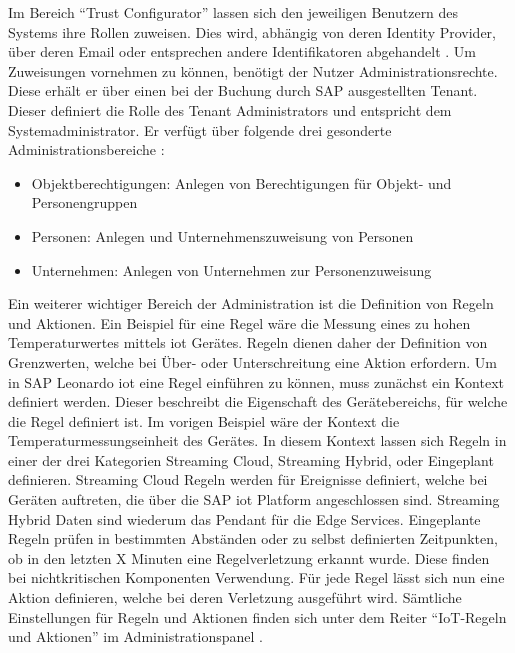 \noindent Im Bereich "`Trust Configurator"' lassen sich den jeweiligen Benutzern des Systems ihre Rollen zuweisen. Dies wird, abhängig von deren Identity Provider, über deren Email oder entsprechen andere Identifikatoren abgehandelt \cite[Seite 209f]{Holtschulte20:IOS}. Um Zuweisungen vornehmen zu können, benötigt der Nutzer Administrationsrechte. Diese erhält er über einen bei der Buchung durch SAP ausgestellten Tenant. Dieser definiert die Rolle des Tenant Administrators und entspricht dem Systemadministrator. Er verfügt über folgende drei gesonderte Administrationsbereiche \cite[Seiten 220 - 221, 223]{Holtschulte20:IOS}:
\begin{itemize}
	\setlength{\itemsep}{1pt}
	\item{Objektberechtigungen: Anlegen von Berechtigungen für Objekt- und Personengruppen}
	\item{Personen: Anlegen und Unternehmenszuweisung von Personen}
	\item{Unternehmen: Anlegen von Unternehmen zur Personenzuweisung}
\end{itemize}
\noindent Ein weiterer wichtiger Bereich der Administration ist die Definition von Regeln und Aktionen. Ein Beispiel für eine Regel wäre die Messung eines zu hohen Temperaturwertes mittels \ac{iot} Gerätes. Regeln dienen daher der Definition von Grenzwerten, welche bei Über- oder Unterschreitung eine Aktion erfordern. Um in SAP Leonardo \ac{iot} eine Regel einführen zu können, muss zunächst ein Kontext definiert werden. Dieser beschreibt die Eigenschaft des Gerätebereichs, für welche die Regel definiert ist. Im vorigen Beispiel wäre der Kontext die Temperaturmessungseinheit des Gerätes. In diesem Kontext lassen sich Regeln in einer der drei Kategorien Streaming Cloud, Streaming Hybrid, oder Eingeplant definieren. Streaming Cloud Regeln werden für Ereignisse definiert, welche bei Geräten auftreten, die über die SAP \ac{iot} Platform angeschlossen sind. Streaming Hybrid Daten sind wiederum das Pendant für die Edge Services. Eingeplante Regeln prüfen in bestimmten Abständen oder zu selbst definierten Zeitpunkten, ob in den letzten X Minuten eine Regelverletzung erkannt wurde. Diese finden bei nichtkritischen Komponenten Verwendung. Für jede Regel lässt sich nun eine Aktion definieren, welche bei deren Verletzung ausgeführt wird. Sämtliche Einstellungen für Regeln und Aktionen finden sich unter dem Reiter "`IoT-Regeln und Aktionen"' im Administrationspanel \cite[Seite 224ff]{Holtschulte20:IOS}.\\   

